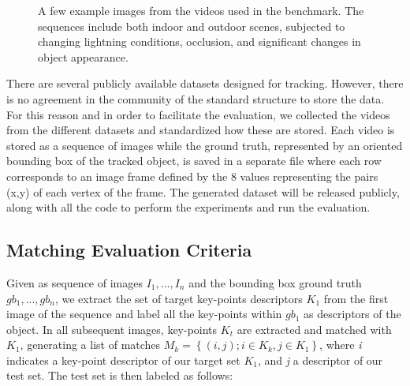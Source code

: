 \begin{figure}[t]
{	
	}
\caption{A few example images from the videos used in the benchmark. The sequences include both indoor and outdoor scenes, subjected to changing lightning conditions, 
occlusion, and significant changes in object appearance.}
\vspace{-3mm}
\label{fig:tracking_results}
\end{figure}


There are several publicly available datasets designed for tracking. However, there is no agreement in the community of the standard structure to store the data. For this reason and in order to facilitate the evaluation, we collected the videos from the different datasets and standardized how these are stored. Each video is stored as a sequence of images while the ground truth, represented by an oriented bounding box of the tracked object, is saved in a separate file where each row corresponds to an image frame defined by the 8 values representing the pairs (x,y) of each vertex of the frame. The generated dataset will be released publicly, along with all the code to perform the experiments and run the evaluation.

\subsection{Matching Evaluation Criteria}
Given as sequence of images $I_{1},...,I_{n}$ and the bounding box ground truth $gb_{1},...,gb_{n}$, we extract the set of target key-points descriptors $K_{1}$ from the first image of the sequence and label all the key-points within $gb_{1}$ as descriptors of the object. In all subsequent images, key-points $K_{t}$ are extracted and matched with $K_{1}$, generating a list of matches $M_k = \left\lbrace (i,j); i \in K_k, j \in K_1 \right\rbrace$, where \textit{i} indicates a key-point descriptor of our target set $K_{1}$, and \textit{j} a descriptor of our test set. The test set is then labeled as follows:

